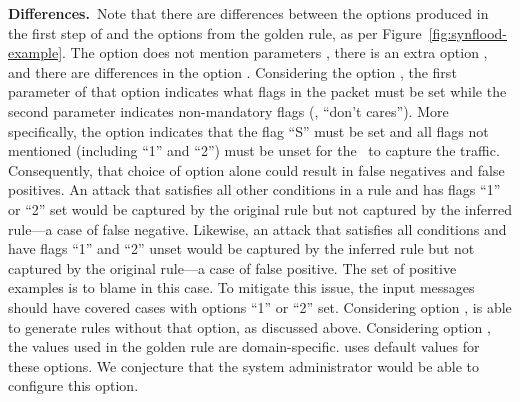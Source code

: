 \documentclass[sigconf,review, anonymous]{acmart}
\begin{document}
\vspace{1ex}
\noindent
\textbf{Differences.}~Note that there are differences between the
options produced in the first step of \tname{} and the options from
the golden rule, as per Figure~\ref{fig:synflood-example}. The option
 does not mention parameters , there is an
extra option , and there are differences in the option
. Considering the option , the first
parameter of that option indicates what flags in the packet must be
set while the second parameter indicates non-mandatory flags (\ie{},
``don't cares''). More specifically, the option 
indicates that the flag ``S'' must be set and all flags not mentioned
(including ``1'' and ``2'') must be unset for the \nids\ to capture
the traffic. Consequently, that choice of option alone could result in
false negatives and false positives. An attack that satisfies all
other conditions in a rule and has flags ``1'' or ``2'' set would be
captured by the original rule but not captured by the inferred rule---a case of
false negative. Likewise, an attack that satisfies all conditions and
have flags ``1'' and ``2'' unset would be captured by the inferred
rule but not captured by the original rule---a case of false positive. The set of
positive examples is to blame in this case. To mitigate this issue,
the input messages should have covered cases with options ``1'' or
``2'' set. Considering option , \tname{} is able
to generate rules without that option, as discussed above. Considering
option , the values used in the golden rule are
domain-specific. \tname{} uses default values for these options. We
conjecture that the system administrator would be able to configure
this option.


\end{document}
